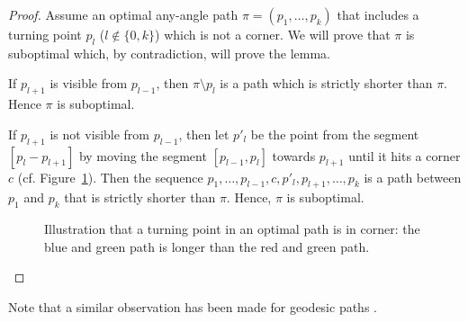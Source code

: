 \begin{proof}
{
  Assume an optimal any-angle path $\pi = (p_1,\dots,p_k)$ 
  that includes a turning point $p_l$ ($l \not\in \{0,k\}$) 
  which is not a corner.  
  We will prove that $\pi$ is suboptimal 
  which, by contradiction, will prove the lemma.  
  
  If $p_{l+1}$ is visible from $p_{l-1}$, 
  then  $\pi \setminus p_l$ is a path 
  which is strictly shorter than $\pi$.  
  Hence $\pi$ is suboptimal.  

  If $p_{l+1}$ is not visible from $p_{l-1}$, 
  then let $p'_l$ be the point from the segment $[p_l-p_{l+1}]$ 
  by moving the segment $[p_{l-1},p_{l}]$ towards $p_{l+1}$ 
  until it hits a corner $c$ (cf. Figure~\ref{fig::corner}).  
  Then the sequence $p_1,\dots,p_{l-1},c,p'_l,p_{l+1},\dots,p_k$ 
  is a path between $p_1$ and $p_k$ 
  that is strictly shorter than $\pi$.  
  Hence, $\pi$ is suboptimal.  
}

\begin{figure}[ht]
  \begin{center}
    
  \end{center}
  \caption{Illustration that a turning point in an optimal path 
  is in corner: 
  the blue and green path is longer than the red and green path.}
  \label{fig::corner}
\end{figure}

\end{proof}

Note that a similar observation has been made for geodesic paths \cite{mitchell87}.  

